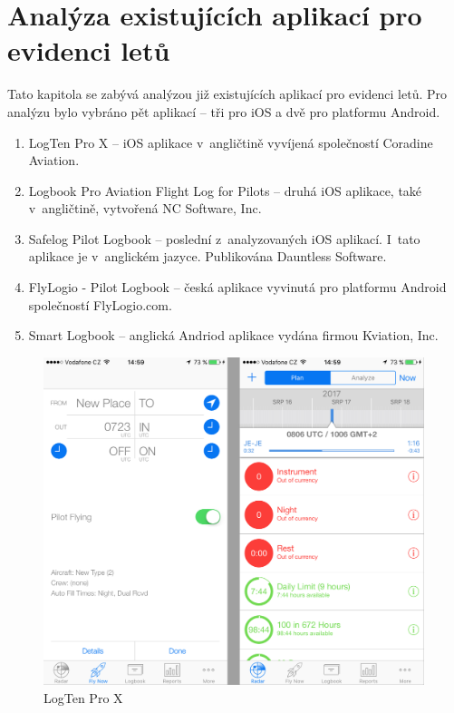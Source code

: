 \documentclass[thesis=M,czech]{FITthesis}[2012/06/26]
\begin{document}
\section{Analýza existujících aplikací pro evidenci letů}
Tato kapitola se zabývá analýzou již existujících aplikací pro evidenci letů. Pro analýzu bylo vybráno pět aplikací -- tři pro iOS a dvě pro platformu Android.
\begin{enumerate}
\item LogTen Pro X -- iOS aplikace v~angličtině vyvíjená společností Coradine Aviation. \cite{appStoreLogTen}
\item Logbook Pro Aviation Flight Log for Pilots -- druhá iOS aplikace, také v~angličtině, vytvořená NC Software, Inc. \cite{appStoreLogbookPro}
\item Safelog Pilot Logbook -- poslední z~analyzovaných iOS aplikací. I~tato aplikace je v~anglickém jazyce. Publikována Dauntless Software. \cite{appStoreSafeLog}
\item FlyLogio - Pilot Logbook -- česká aplikace vyvinutá pro platformu Android společností FlyLogio.com. \cite{googleFlyLogio}
\item Smart Logbook -- anglická Andriod aplikace vydána firmou Kviation, Inc. \cite{googleSmartLogbook}
\end{enumerate}

\begin{figure}[]\centering
 \includegraphics[width=0.99\textwidth]{./pictures/existujiciAplikace/LogTenProX}
 \caption[LogTen Pro X]{LogTen Pro X}\label{fig:LogTenProX}
\end{figure}
\end{document}
